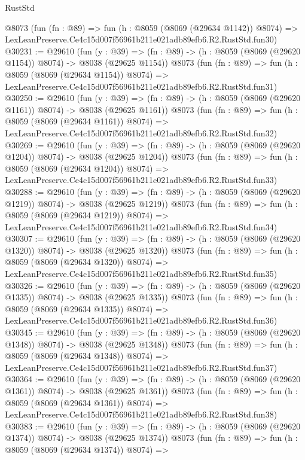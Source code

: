 \begin{lexlean}{RustStd}
\begin{coremodule}
    @8073
    (fun (fn : @89) =>
    fun (h : @8059 (@8069 (@29634 @1142)) @8074) =>
    LexLeanPreserve.Ce4c15d007f56961b211e021adb89efb6.R2.RustStd.fun30)
@30231 := @29610
    (fun (y : @39) =>
    (fn : @89) -> (h : @8059 (@8069 (@29620 @1154)) @8074) -> @8038 (@29625 @1154))
    @8073
    (fun (fn : @89) =>
    fun (h : @8059 (@8069 (@29634 @1154)) @8074) =>
    LexLeanPreserve.Ce4c15d007f56961b211e021adb89efb6.R2.RustStd.fun31)
@30250 := @29610
    (fun (y : @39) =>
    (fn : @89) -> (h : @8059 (@8069 (@29620 @1161)) @8074) -> @8038 (@29625 @1161))
    @8073
    (fun (fn : @89) =>
    fun (h : @8059 (@8069 (@29634 @1161)) @8074) =>
    LexLeanPreserve.Ce4c15d007f56961b211e021adb89efb6.R2.RustStd.fun32)
@30269 := @29610
    (fun (y : @39) =>
    (fn : @89) -> (h : @8059 (@8069 (@29620 @1204)) @8074) -> @8038 (@29625 @1204))
    @8073
    (fun (fn : @89) =>
    fun (h : @8059 (@8069 (@29634 @1204)) @8074) =>
    LexLeanPreserve.Ce4c15d007f56961b211e021adb89efb6.R2.RustStd.fun33)
@30288 := @29610
    (fun (y : @39) =>
    (fn : @89) -> (h : @8059 (@8069 (@29620 @1219)) @8074) -> @8038 (@29625 @1219))
    @8073
    (fun (fn : @89) =>
    fun (h : @8059 (@8069 (@29634 @1219)) @8074) =>
    LexLeanPreserve.Ce4c15d007f56961b211e021adb89efb6.R2.RustStd.fun34)
@30307 := @29610
    (fun (y : @39) =>
    (fn : @89) -> (h : @8059 (@8069 (@29620 @1320)) @8074) -> @8038 (@29625 @1320))
    @8073
    (fun (fn : @89) =>
    fun (h : @8059 (@8069 (@29634 @1320)) @8074) =>
    LexLeanPreserve.Ce4c15d007f56961b211e021adb89efb6.R2.RustStd.fun35)
@30326 := @29610
    (fun (y : @39) =>
    (fn : @89) -> (h : @8059 (@8069 (@29620 @1335)) @8074) -> @8038 (@29625 @1335))
    @8073
    (fun (fn : @89) =>
    fun (h : @8059 (@8069 (@29634 @1335)) @8074) =>
    LexLeanPreserve.Ce4c15d007f56961b211e021adb89efb6.R2.RustStd.fun36)
@30345 := @29610
    (fun (y : @39) =>
    (fn : @89) -> (h : @8059 (@8069 (@29620 @1348)) @8074) -> @8038 (@29625 @1348))
    @8073
    (fun (fn : @89) =>
    fun (h : @8059 (@8069 (@29634 @1348)) @8074) =>
    LexLeanPreserve.Ce4c15d007f56961b211e021adb89efb6.R2.RustStd.fun37)
@30364 := @29610
    (fun (y : @39) =>
    (fn : @89) -> (h : @8059 (@8069 (@29620 @1361)) @8074) -> @8038 (@29625 @1361))
    @8073
    (fun (fn : @89) =>
    fun (h : @8059 (@8069 (@29634 @1361)) @8074) =>
    LexLeanPreserve.Ce4c15d007f56961b211e021adb89efb6.R2.RustStd.fun38)
@30383 := @29610
    (fun (y : @39) =>
    (fn : @89) -> (h : @8059 (@8069 (@29620 @1374)) @8074) -> @8038 (@29625 @1374))
    @8073
    (fun (fn : @89) =>
    fun (h : @8059 (@8069 (@29634 @1374)) @8074) =>

\end{coremodule}
\end{lexlean}
